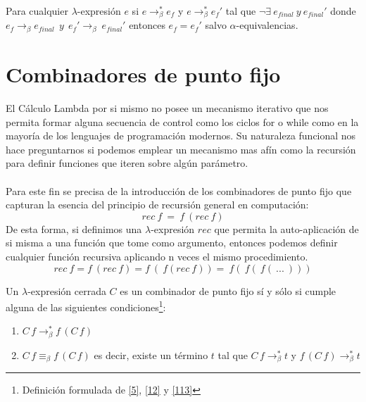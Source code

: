                     \begin{corollary}
Para cualquier $\lambda$-expresión $e$ si $e\to_\beta^*e_f$ y $e\to_\beta^*e_f'$ tal que  $\neg \exists\ e_{final}\ y\ e_{final}'$ donde $e_f \rightarrow_{\beta} e_{final}\ \ y\ \ e_f' \rightarrow_{\beta}\ e_{final}'$
entonces $e_f = e_f'$ salvo $\alpha$-equivalencias. 
                    \end{corollary}

        \section{Combinadores de punto fijo}
                    El Cálculo Lambda por si mismo no posee un mecanismo iterativo que nos permita formar alguna secuencia de control como los ciclos \textsf{for} o \textsf{while} como en la mayoría de los lenguajes de programación modernos. Su naturaleza funcional nos hace preguntarnos si podemos emplear un mecanismo mas afín como la recursión para definir funciones que iteren sobre algún parámetro.\\\\
                   Para este fin se precisa de la introducción de los combinadores de punto fijo que capturan la esencia del principio de recursión general en computación:
                    $$ rec\ f\ =\ f\ (rec\ f) $$
                    De esta forma, si definimos una $\lambda$-expresión $rec$ que permita la auto-aplicación de si misma a una función que tome como argumento, entonces podemos definir cualquier función recursiva aplicando n veces el mismo procedimiento.
                    $$rec\ f = f\ (rec\ f) = f\ (\ f(rec\ f)) =\ f(\ f(\ f(\ ...\ )))$$
                    
                    \begin{definition} Un $\lambda$-expresión cerrada $C$ es un combinador de punto fijo sí y sólo si cumple alguna de las siguientes condiciones\footnote{Definición formulada de \hyperlink{5}{[5]}, \hyperlink{12}{[12]} y \hyperlink{113}{[113]}}:
                        \begin{enumerate}
                            \item $C\,f\to_\beta^*f\,(C\,f)$
                            \item $C\,f\equiv_\beta f\,(C\,f)$ es decir, existe un término $t$ tal que $C\,f\to_\beta^*t$ y $f\,(C\,f)\to_\beta^*t$
                        \end{enumerate}
                    \end{definition}

